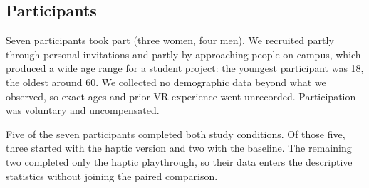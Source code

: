 
\subsection{Participants}
\label{sec:study-participants}

Seven participants took part (three women, four men). We recruited partly through personal invitations and partly by approaching people on campus, which produced a wide age range for a student project: the youngest participant was 18, the oldest around 60. We collected no demographic data beyond what we observed, so exact ages and prior VR experience went unrecorded. Participation was voluntary and uncompensated.

Five of the seven participants completed both study conditions. Of those five, three started with the haptic version and two with the baseline. The remaining two completed only the haptic playthrough, so their data enters the descriptive statistics without joining the paired comparison.
